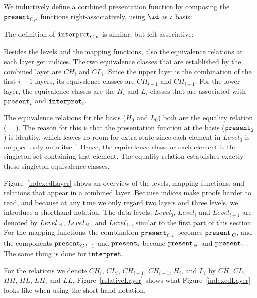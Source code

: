 We inductively define a combined presentation function by composing the ${\tt present}_{\mathrm{C},i}$ functions right-associatively, using $\id$ as a basis:


The definition of ${\tt interpret}_{\mathrm{C},n}$ is similar, but left-associative:


Besides the levels and the mapping functions, also the equivalence relations at each layer get indices. The two equivalence classes that are established by the combined layer are $CH_i$ and $CL_i$. Since the upper layer is the combination of the first $i-1$ layers, its equivalence classes are $CH_{i-1}$ and $CH_{i-1}$. For the lower layer, the equivalence classes are the $H_i$ and $L_i$ classes that are associated with ${\tt present}_i$ and ${\tt interpret}_i$. 

The equivalence relations for the basis ($H_0$ and $L_0$) both are the equality relation ($=$). The reason for this is that the presentation function at the basis (${\tt present}_0$) is identity, which leaves no room for extra state since each element in $Level_0$ is mapped only onto itself. Hence, the equivalence class for each element is the singleton set containing that element. The equality relation establishes exactly these singleton equivalence classes.

Figure~\ref{indexedLayer} shows an overview of the levels, mapping functions, and relations that appear in a combined layer. Because indices make proofs harder to read, and because at any time we only regard two layers and three levels, we introduce a shorthand notation. The data levels, $Level_0$, $Level_i$ and $Level_{i+1}$ are denoted by $Level_{\, \mathrm H}$, $Level_{\, \mathrm M}$, and $Level_{\, \mathrm L}$, similar to the first part of this section. For the mapping functions, the combination ${\tt present}_{\mathrm{C},i}$ becomes ${\tt present}_{\, \mathrm C}$, and the components ${\tt present}_{\mathrm{C},{i-1}}$ and ${\tt present}_i$ become ${\tt present}_{\, \mathrm H}$ and ${\tt present}_{\, \mathrm L}$. The same thing is done for ${\tt interpret}$.

For the relations we denote $CH_i$, $CL_i$, $CH_{i-1}$, $CH_{i-1}$, $H_i$, and $L_i$ by $CH$, $CL$, $HH$, $HL$, $LH$, and $LL$. Figure~\ref{relativeLayer} shows what Figure~\ref{indexedLayer} looks like when using the short-hand notation. 

